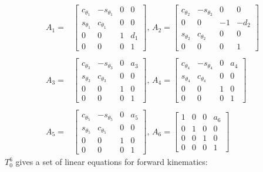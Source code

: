 \documentclass[11pt,a4paper, titlepage]{article}
\begin{document}
\begin{appendices}
\begin{equation*}
\begin{split}
A_{1} =
&\begin{bmatrix}
c_{\theta_1} & -s_{\theta_1} & 0 & 0 \\
s_{\theta_1} & c_{\theta_1} & 0 & 0 \\
0 & 0 & 1 & d_1 \\
0 & 0 & 0 & 1			 
\end{bmatrix},\,
A_{2} =
\begin{bmatrix}
c_{\theta_2} & -s_{\theta_2} & 0 & 0 \\
0 & 0 & -1 & -d_2 \\
s_{\theta_2} & c_{\theta_2} & 0 & 0 \\
0 & 0 & 0 & 1			 
\end{bmatrix} \\\\
A_{3} =
&\begin{bmatrix}
c_{\theta_3} & -s_{\theta_3} & 0 & a_3 \\
s_{\theta_3} & c_{\theta_3} & 0 & 0 \\
0 & 0 & 1 & 0 \\
0 & 0 & 0 & 1			 
\end{bmatrix},\,
A_{4} =
\begin{bmatrix}
c_{\theta_4} & -s_{\theta_4} & 0 & a_4 \\
s_{\theta_4} & c_{\theta_4} & 0 & 0 \\
0 & 0 & 1 & 0 \\
0 & 0 & 0 & 1			 
\end{bmatrix} \\\\
A_{5} =
&\begin{bmatrix}
c_{\theta_5} & -s_{\theta_5} & 0 & a_5 \\
s_{\theta_5} & c_{\theta_5} & 0 &0 \\
0 & 0 & 1 & 0 \\
0 & 0 & 0 & 1			 
\end{bmatrix},\,
A_{6} =
\begin{bmatrix}
1 & 0 & 0 & a_6 \\
0 & 1 & 0 & 0 \\
0 & 0 & 1 & 0 \\
0 & 0 & 0 & 1			 
\end{bmatrix}
\end{split}
\end{equation*}
\newpage
$T_0^6$ gives a set of linear equations for forward kinematics:


\end{appendices}
\end{document}
